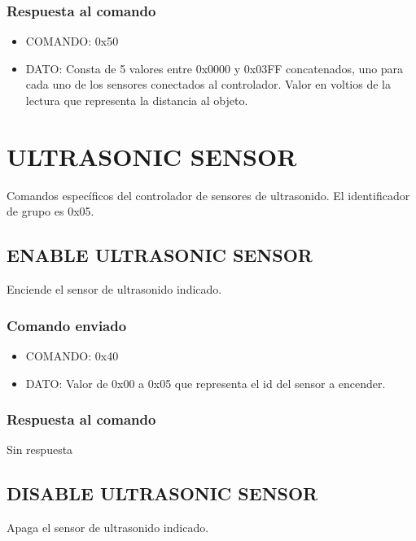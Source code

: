 \documentclass[a4paper,10pt]{article}
\begin{document}
\subsubsection*{Respuesta al comando}

\begin{itemize}
	\item{COMANDO:} 0x50
	\item{DATO:} Consta de 5 valores entre 0x0000 y 0x03FF concatenados, uno para cada uno de los sensores conectados al controlador.
	Valor en voltios de la lectura que representa la distancia al objeto.
\end{itemize}

\section{ULTRASONIC SENSOR} 
\label{grupo_ultrasonic_sensor}

Comandos espec\'ificos del controlador de sensores de ultrasonido.
El identificador de grupo es 0x05.

\subsection{ENABLE ULTRASONIC SENSOR}
\label{enable_ultrasonic_sensor}

Enciende el sensor de ultrasonido indicado.

\subsubsection*{Comando enviado}

\begin{itemize}
	\item{COMANDO:} 0x40
	\item{DATO:} Valor de 0x00 a 0x05 que representa el id del sensor a encender.
\end{itemize}

\subsubsection*{Respuesta al comando}

Sin respuesta

\subsection{DISABLE ULTRASONIC SENSOR}
\label{disable_ultrasonic_sensor}

Apaga el sensor de ultrasonido indicado.
\end{document}
